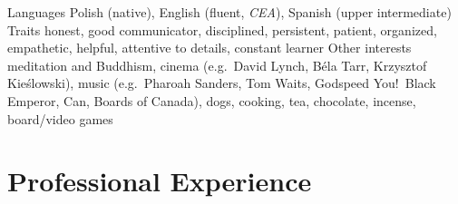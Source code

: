 \begin{sectionlist}
    \sectionlistitem
        {Languages}
        {
            Polish (native),
            English (fluent, \emph{CEA}),
            Spanish (upper intermediate)
        }
    \sectionlistitem
        {Traits}
        {
            honest, good communicator, disciplined, persistent, patient, organized,
            empathetic, helpful, attentive to details, constant learner
        }
    \sectionlistitem
        {Other interests}
        {
            meditation and Buddhism, cinema (e.g.~David Lynch, Béla Tarr, Krzysztof
            Kieślowski), music (e.g.~Pharoah Sanders, Tom Waits, Godspeed You!\ Black Emperor,
            Can, Boards of Canada), dogs, cooking, tea, chocolate, incense, board/video games
        }
\end{sectionlist}


\section{Professional Experience}

